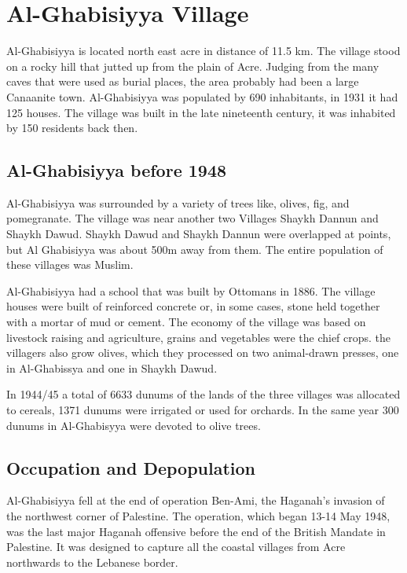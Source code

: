\section{Al-Ghabisiyya Village}

Al-Ghabisiyya is located north east acre in distance of 11.5 km. The village stood on a rocky hill that jutted up from the plain of Acre. Judging from the many caves that were used as burial places, the area probably had been a large Canaanite town.
Al-Ghabisiyya was populated by 690 inhabitants, in 1931 it had 125 houses. The village was built in the late nineteenth century, it was inhabited by 150 residents back then\citep{Khalidi2015}.
\subsection{Al-Ghabisiyya before 1948}

 Al-Ghabisiyya was surrounded by a variety of trees like, olives, fig, and pomegranate. The village was near another two Villages Shaykh Dannun and Shaykh Dawud. Shaykh Dawud and Shaykh Dannun were overlapped at points, but Al Ghabisiyya was about 500m away from them. The entire population of these villages was Muslim. 

Al-Ghabisiyya had a school that was built by Ottomans in 1886. The village houses were built of reinforced concrete or, in some cases, stone held together with a mortar of mud or cement. The economy of the village was based on livestock raising and agriculture, grains and vegetables were the chief crops. the villagers also grow olives, which they processed on two animal-drawn presses, one in Al-Ghabissya and one in Shaykh Dawud.

In 1944/45 a total of 6633 dunums of the lands of the three villages was allocated to cereals, 1371 dunums were irrigated or used for orchards. In the same year 300 dunums in Al-Ghabisyya were devoted to olive trees\citep{Khalidi2015}.

\subsection{Occupation and Depopulation}

Al-Ghabisiyya fell at the end of operation Ben-Ami, the Haganah's invasion of the northwest corner of Palestine. The operation, which began 13-14 May 1948, was the last major Haganah offensive before the end of the British Mandate in Palestine. It was designed to capture all the coastal villages from Acre northwards to the Lebanese border\citep{Khalidi2015}.

